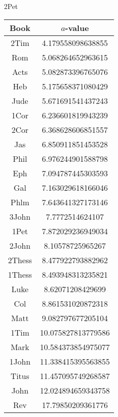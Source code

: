 \documentclass[12pt,letterpaper]{article}
\begin{document}
2Pet
\begin{longtable}{|c|c|}
\hline
 Book & $a$-value \\ \hline
2Tim & 4.179558098638855 \\ \hline
 Rom & 5.068264652963615 \\ \hline
 Acts & 5.082873396765076 \\ \hline
 Heb & 5.175658371080429 \\ \hline
 Jude & 5.671691541437243 \\ \hline
 1Cor & 6.236601819943239 \\ \hline
 2Cor & 6.368628606851557 \\ \hline
 Jas & 6.850911851453528 \\ \hline
 Phil & 6.976244901588798 \\ \hline
 Eph & 7.094787445303593 \\ \hline
 Gal & 7.163029618166046 \\ \hline
 Phlm & 7.643641327173146 \\ \hline
 3John & 7.7772514624107 \\ \hline
 1Pet & 7.872029236949034 \\ \hline
 2John & 8.10578725965267 \\ \hline
 2Thess & 8.477922793882962 \\ \hline
 1Thess & 8.493948313235821 \\ \hline
 Luke & 8.62071208429699 \\ \hline
 Col & 8.861531020872318 \\ \hline
 Matt & 9.082797677205104 \\ \hline
 1Tim & 10.075827813779586 \\ \hline
 Mark & 10.584373854975077 \\ \hline
 1John & 11.338415395563855 \\ \hline
 Titus & 11.457095749268587 \\ \hline
 John & 12.024894659343758 \\ \hline
 Rev & 17.79850209361776 \\ \hline 
\end{longtable}
\end{document}
